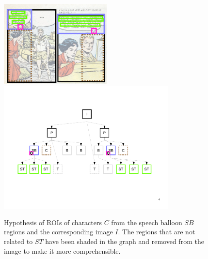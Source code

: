  \begin{figure}[!ht]  %
   \centering
   \includegraphics[trim= 0px 0px 0px 0px, clip, width=0.5\textwidth]{process_illustration_hypo_2_1.png}\\
  \includegraphics[trim= 30px 168px 20px 110px, clip, width=0.8\textwidth]{graph_init_2_1.pdf}
  \caption[Hypothesis of ROIs of characters $C$ from the speech balloon $SB$ regions and the corresponding image $I$]{Hypothesis of ROIs of characters $C$ from the speech balloon $SB$ regions and the corresponding image $I$. The regions that are not related to $ST$ have been shaded in the graph and removed from the image to make it more comprehensible.
  }
  \label{fig:kn:hypothesis_roi}
 \end{figure}


